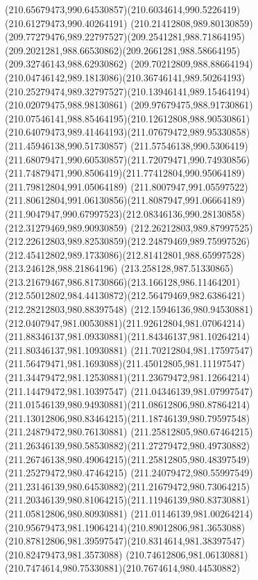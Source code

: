 {    \curveto(210.65679473,990.64530857)(210.6034614,990.5226419)(210.61279473,990.40264191)
    \curveto(210.21412808,989.80130859)(209.77279476,989.22797527)(209.2541281,988.71864195)
    \curveto(209.2021281,988.66530862)(209.2661281,988.58664195)(209.32746143,988.62930862)
    \curveto(209.70212809,988.88664194)(210.04746142,989.1813086)(210.36746141,989.50264193)
    \curveto(210.25279474,989.32797527)(210.13946141,989.15464194)(210.02079475,988.98130861)
    \curveto(209.97679475,988.91730861)(210.07546141,988.85464195)(210.12612808,988.90530861)
    \curveto(210.64079473,989.41464193)(211.07679472,989.95330858)(211.45946138,990.51730857)
    \curveto(211.57546138,990.5306419)(211.68079471,990.60530857)(211.72079471,990.74930856)
    \curveto(211.74879471,990.8506419)(211.77412804,990.95064189)(211.79812804,991.05064189)
    \curveto(211.8007947,991.05597522)(211.80612804,991.06130856)(211.8087947,991.06664189)
    \curveto(211.9047947,990.67997523)(212.08346136,990.28130858)(212.31279469,989.90930859)
    \curveto(212.26212803,989.87997525)(212.22612803,989.82530859)(212.24879469,989.75997526)
    \curveto(212.45412802,989.1733086)(212.81412801,988.65997528)(213.246128,988.21864196)
    \curveto(213.258128,987.51330865)(213.21679467,986.81730866)(213.166128,986.11464201)
    \curveto(212.55012802,984.44130872)(212.56479469,982.6386421)(212.28212803,980.88397548)
    \curveto(212.15946136,980.94530881)(212.0407947,981.00530881)(211.92612804,981.07064214)
    \curveto(211.88346137,981.09330881)(211.84346137,981.10264214)(211.80346137,981.10930881)
    \curveto(211.70212804,981.17597547)(211.56479471,981.1693088)(211.45012805,981.11197547)
    \curveto(211.34479472,981.12530881)(211.23679472,981.12664214)(211.14479472,981.10397547)
    \curveto(211.04346139,981.07997547)(211.01546139,980.94930881)(211.08612806,980.87864214)
    \curveto(211.13012806,980.83464215)(211.18746139,980.79597548)(211.24879472,980.76130881)
    \curveto(211.25812805,980.67464215)(211.26346139,980.58530882)(211.27279472,980.49730882)
    \curveto(211.26746138,980.49064215)(211.25812805,980.48397549)(211.25279472,980.47464215)
    \curveto(211.24079472,980.55997549)(211.23146139,980.64530882)(211.21679472,980.73064215)
    \curveto(211.20346139,980.81064215)(211.11946139,980.83730881)(211.05812806,980.80930881)
    \curveto(211.01146139,981.00264214)(210.95679473,981.19064214)(210.89012806,981.3653088)
    \curveto(210.87812806,981.39597547)(210.8314614,981.38397547)(210.82479473,981.3573088)
    \curveto(210.74612806,981.06130881)(210.7474614,980.75330881)(210.7674614,980.44530882)
}
